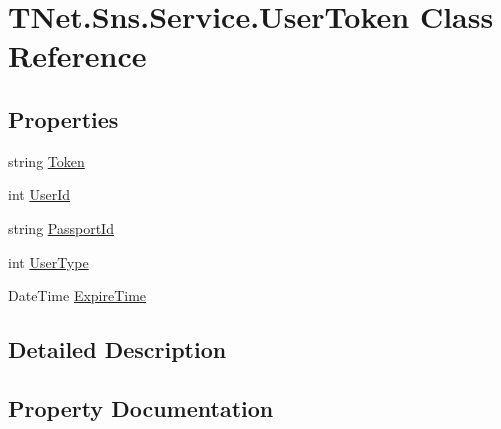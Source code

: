 \hypertarget{class_t_net_1_1_sns_1_1_service_1_1_user_token}{}\section{T\+Net.\+Sns.\+Service.\+User\+Token Class Reference}
\label{class_t_net_1_1_sns_1_1_service_1_1_user_token}


 


\subsection*{Properties}
\begin{DoxyCompactItemize}
\item 
string \mbox{\hyperlink{class_t_net_1_1_sns_1_1_service_1_1_user_token_aa711534cb577e8b66a46daa8663ce8b2}{Token}}
\item 
int \mbox{\hyperlink{class_t_net_1_1_sns_1_1_service_1_1_user_token_af0242111b3e77cc6c210ef691df6cff0}{User\+Id}}
\item 
string \mbox{\hyperlink{class_t_net_1_1_sns_1_1_service_1_1_user_token_a1e792d8849fb055dbeb7ee6b91c06891}{Passport\+Id}}
\item 
int \mbox{\hyperlink{class_t_net_1_1_sns_1_1_service_1_1_user_token_a636ca2941a4d72ed60dd3be95c999849}{User\+Type}}
\item 
Date\+Time \mbox{\hyperlink{class_t_net_1_1_sns_1_1_service_1_1_user_token_a7896f4ef898fae9ad7745f8ba2381bce}{Expire\+Time}}
\end{DoxyCompactItemize}


\subsection{Detailed Description}




\subsection{Property Documentation}
\mbox{\label{class_t_net_1_1_sns_1_1_service_1_1_user_token_a7896f4ef898fae9ad7745f8ba2381bce}} 
